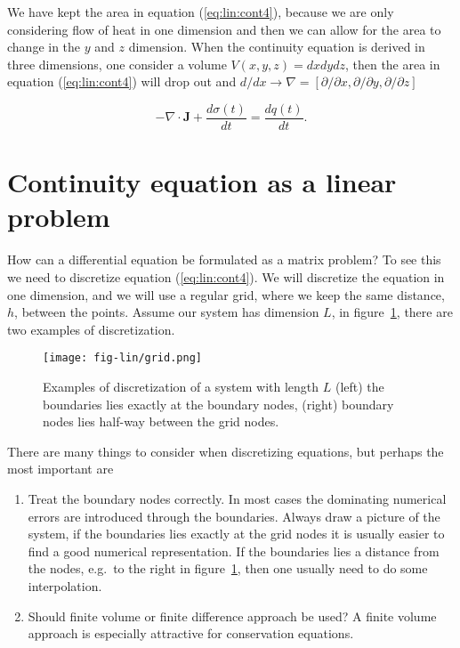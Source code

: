\documentclass[graybox,sectrefs,envcountresetchap,open=right,final]{svmonodo}
\newenvironment{graybox2admon}[1][]{
\begin{graybox2mdframed}[frametitle=#1]
}
{
\end{graybox2mdframed}
}
\begin{document}
We have kept the area in equation (\ref{eq:lin:cont4}), because we are only considering flow of heat in one dimension and then we can allow for the area to change in the $y$ and $z$ dimension. When the continuity equation is derived in three dimensions, one consider a volume $V(x,y,z)=dxdydz$, then the area in equation (\ref{eq:lin:cont4}) will drop out and $d/dx\to\nabla=[\partial/\partial x, \partial/\partial y, \partial/\partial z]$ 


\begin{graybox2admon}[The continuity equation in 3 dimensions]
\begin{equation}
-\nabla\cdot\mathbf{J}+\frac{d\sigma(t)}{dt}=\frac{dq(t)}{dt}.
\label{eq:lin:cont5}
\end{equation}
\end{graybox2admon}




\section{Continuity equation as a linear problem}

How can a differential equation be formulated as a matrix problem? To see this we need to discretize equation (\ref{eq:lin:cont4}). We will discretize the equation in one dimension, and we will use a regular grid, where we keep the same distance, $h$, between the points. Assume our system has dimension $L$, in figure~\ref{fig:lin:grid}, there are two examples of discretization.  

\begin{figure}[!ht]  %
  \centerline{\texttt{[image: fig-lin/grid.png]}}
  \caption{
  Examples of discretization of a system with length $L$ (left) the  boundaries lies exactly at the boundary nodes, (right) boundary nodes lies half-way between the grid nodes. \label{fig:lin:grid}
  }
\end{figure}

There are many things to consider when discretizing equations, but perhaps the most important are
\begin{enumerate}
\item Treat the boundary nodes correctly. In most cases the dominating numerical errors are introduced through the boundaries. Always draw a picture of the system, if the boundaries lies exactly at the grid nodes it is usually easier to find a good numerical representation. If the boundaries lies a distance from the nodes, e.g.~to the right in figure~\ref{fig:lin:grid}, then one usually need to do some interpolation.

\item Should finite volume or finite difference approach be used? A finite volume approach is especially attractive for conservation equations.
\end{enumerate}
\end{document}
